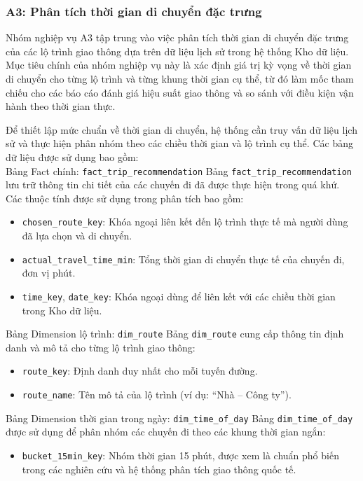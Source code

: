 \subsubsection{A3: Phân tích thời gian di chuyển đặc trưng}

Nhóm nghiệp vụ A3 tập trung vào việc phân tích thời gian di chuyển đặc trưng của các lộ trình giao thông dựa trên dữ liệu lịch sử trong hệ thống Kho dữ liệu. Mục tiêu chính của nhóm nghiệp vụ này là xác định giá trị kỳ vọng về thời gian di chuyển cho từng lộ trình và từng khung thời gian cụ thể, từ đó làm mốc tham chiếu cho các báo cáo đánh giá hiệu suất giao thông và so sánh với điều kiện vận hành theo thời gian thực.


Để thiết lập mức chuẩn về thời gian di chuyển, hệ thống cần truy vấn dữ liệu lịch sử và thực hiện phân nhóm theo các chiều thời gian và lộ trình cụ thể. Các bảng dữ liệu được sử dụng bao gồm:\\

Bảng Fact chính: \texttt{fact\_trip\_recommendation}
Bảng \texttt{fact\_trip\_recommendation} lưu trữ thông tin chi tiết của các chuyến đi đã được thực hiện trong quá khứ. Các thuộc tính được sử dụng trong phân tích bao gồm:
\begin{itemize}
    \item \texttt{chosen\_route\_key}: Khóa ngoại liên kết đến lộ trình thực tế mà người dùng đã lựa chọn và di chuyển.
    \item \texttt{actual\_travel\_time\_min}: Tổng thời gian di chuyển thực tế của chuyến đi, đơn vị phút.
    \item \texttt{time\_key}, \texttt{date\_key}: Khóa ngoại dùng để liên kết với các chiều thời gian trong Kho dữ liệu.
\end{itemize}

Bảng Dimension lộ trình: \texttt{dim\_route}
Bảng \texttt{dim\_route} cung cấp thông tin định danh và mô tả cho từng lộ trình giao thông:
\begin{itemize}
    \item \texttt{route\_key}: Định danh duy nhất cho mỗi tuyến đường.
    \item \texttt{route\_name}: Tên mô tả của lộ trình (ví dụ: ``Nhà -- Công ty'').
\end{itemize}

Bảng Dimension thời gian trong ngày: \texttt{dim\_time\_of\_day}
Bảng \texttt{dim\_time\_of\_day} được sử dụng để phân nhóm các chuyến đi theo các khung thời gian ngắn:
\begin{itemize}
    \item \texttt{bucket\_15min\_key}: Nhóm thời gian 15 phút, được xem là chuẩn phổ biến trong các nghiên cứu và hệ thống phân tích giao thông quốc tế.
\end{itemize}

